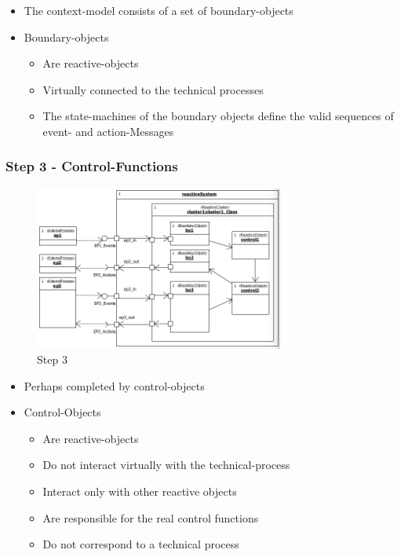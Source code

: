 \begin{itemize}
\tightlist
\item
  The context-model consists of a set of boundary-objects
\item
  Boundary-objects

  \begin{itemize}
  \tightlist
  \item
    Are reactive-objects
  \item
    Virtually connected to the technical processes
  \item
    The state-machines of the boundary objects define the valid
    sequences of event- and action-Messages
  \end{itemize}
\end{itemize}

\hypertarget{step-3---control-functions}{%
\subsubsection{Step 3 -
Control-Functions}\label{step-3---control-functions}}

\begin{figure}[H]
\centering
\includegraphics[width=0.73\textwidth]{figures/step3ReactiveMachineModelsDevelopment.png}
\caption{Step 3}
\end{figure}

\begin{itemize}
\tightlist
\item
  Perhaps completed by control-objects
\item
  Control-Objects

  \begin{itemize}
  \tightlist
  \item
    Are reactive-objects
  \item
    Do not interact virtually with the technical-process
  \item
    Interact only with other reactive objects
  \item
    Are responsible for the real control functions
  \item
    Do not correspond to a technical process
  \end{itemize}
\end{itemize}


